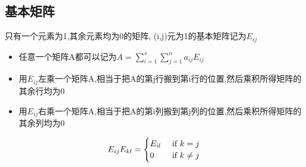 \documentclass{book}
\begin{document}
\subsection{基本矩阵}
只有一个元素为1,其余元素均为0的矩阵, (i,j)元为1的基本矩阵记为$E_{ij}$
\begin{itemize}
\item 任意一个矩阵A都可以记为$A=\sum_{i=1}^s {\sum_{j=1}^n {a_{ij}E_{ij}}}$
\item 用$E_{ij}$左乘一个矩阵A,相当于把A的第j行搬到第i行的位置,然后乘积所得矩阵的其余行均为0
\item 用$E_{ij}$右乘一个矩阵A,相当于把A的第i列搬到第j列的位置,然后乘积所得矩阵的其余列均为0
\end{itemize}
$$
E_{ij}E_{kl}=
\begin{cases}
  E_{il} & \textrm{\ if } k=j \\
  0 & \textrm{\ if } k \neq j
\end{cases}
$$
\end{document}
